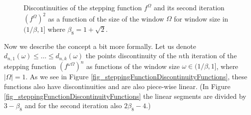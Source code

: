 \documentclass[text.tex]{subfiles}
\begin{document}
\begin{figure}[h!]
\caption{Discontinuities of the stepping function $f^\Omega$ and its second iteration $(f^\Omega)^2$ as a function of the size of the window $\Omega$ for window size in $(1/\beta,1]$ where $\beta_8 = 1+\sqrt{2}$. }
\label{fig_steppingFunctionDiscontinuities}
\end{figure}

Now we describe the concept a bit more formally. Let us denote $d_{n,1}(\omega)\leq\dots\leq d_{n,k}(\omega)$ the points discontinuity of the $n$th iteration of the stepping function $(f^{\omega\Omega})^n$ as functions of the window size $\omega\in(1/\beta,1]$, where $|\Omega|=1$. As we see in Figure \ref{fig_steppingFunctionDiscontinuityFunctions}, these functions also have discontinuities and are also piece-wise linear. (In Figure \ref{fig_steppingFunctionDiscontinuityFunctions} the linear segments are divided by $3-\beta_8$ and for the second iteration also $2\beta_8-4$.) 
\end{document}
